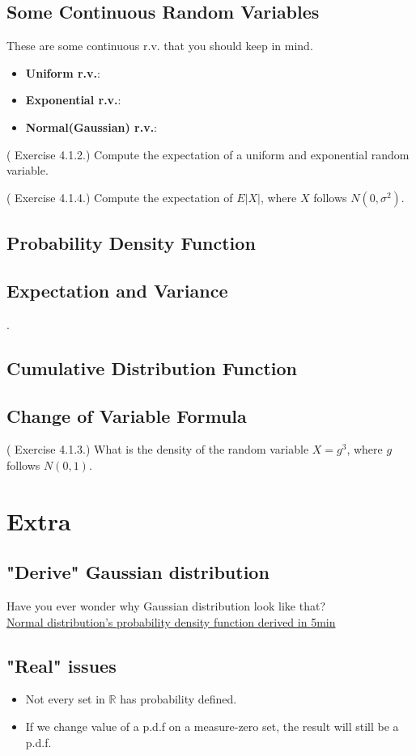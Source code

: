 \subsection{Some Continuous Random Variables}
These are some continuous r.v. that you should keep in mind. 
\begin{itemize}
    \item \textbf{Uniform r.v.}:\\
    \item \textbf{Exponential r.v.}: \\
    \item \textbf{Normal(Gaussian) r.v.}: \\   
\end{itemize}
\begin{eg}
    (\cite{IntroPanchenko} Exercise 4.1.2.) Compute the expectation of a uniform and
exponential random variable.
\end{eg}
\begin{exercise}
    (\cite{IntroPanchenko} Exercise 4.1.4.) Compute the expectation of \(E |X|\), where \(X\) follows \(N(0,\sigma^2)\).  
\end{exercise}
\subsection{Probability Density Function}
\subsection{Expectation and Variance}. 

\subsection{Cumulative Distribution Function}
\subsection{Change of Variable Formula}

\begin{eg}
    (\cite{IntroPanchenko} Exercise 4.1.3.) What is the density of the random variable \(X = g^3\), where \(g\) follows \(N(0,1)\).
\end{eg}
\section{Extra}
\subsection*{"Derive" Gaussian distribution}
Have you ever wonder why Gaussian distribution look like that? \\
\href{https://youtu.be/ebewBjZmZTw}{Normal distribution's probability density function derived in 5min}

\subsection*{"Real" issues}
\begin{itemize}
    \item Not every set in \(\mathbb{R}\) has probability defined. 
    \item If we change value of a p.d.f on a measure-zero set, the result will still be a p.d.f.    
\end{itemize}
